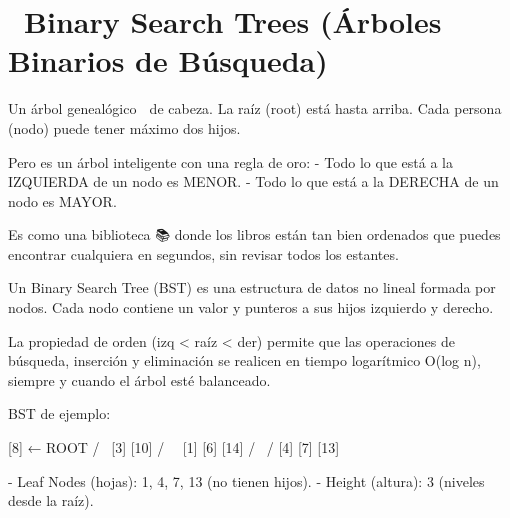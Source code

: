 ﻿\chapter[\emj{🌳}~Binary Search Trees (Árboles Binarios de Búsqueda)]{~Binary Search Trees (Árboles Binarios de Búsqueda)}

\begin{dsaquees}

Un árbol genealógico 🌳 de cabeza. La raíz (root) está hasta arriba.
Cada persona (nodo) puede tener máximo dos hijos.

Pero es un árbol inteligente con una regla de oro:
- Todo lo que está a la IZQUIERDA de un nodo es MENOR.
- Todo lo que está a la DERECHA de un nodo es MAYOR.

Es como una biblioteca 📚 donde los libros están tan bien ordenados
que puedes encontrar cualquiera en segundos, sin revisar todos los 
estantes.

\end{dsaquees}

\begin{dsaotraforma}

Un Binary Search Tree (BST) es una estructura de datos no lineal
formada por nodos. Cada nodo contiene un valor y punteros a sus hijos
izquierdo y derecho.

La propiedad de orden (izq < raíz < der) permite que las operaciones
de búsqueda, inserción y eliminación se realicen en tiempo 
logarítmico O(log n), siempre y cuando el árbol esté balanceado.

\end{dsaotraforma}

\begin{dsadiagrama}
BST de ejemplo:

         [8]          ← ROOT
       /     \
    [3]       [10]
   /   \         \
 [1]    [6]       [14]
       /   \      /
     [4]   [7]  [13]

- Leaf Nodes (hojas): 1, 4, 7, 13 (no tienen hijos).
- Height (altura): 3 (niveles desde la raíz).
\end{dsadiagrama}

